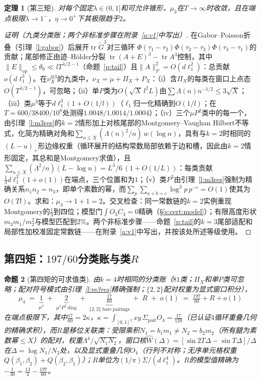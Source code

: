\documentclass[11pt]{article}
\numberwithin{equation}{section}
\newtheorem{theorem}{定理}[section]
\newtheorem{proposition}[theorem]{命题}
\theoremstyle{definition}
\theoremstyle{remark}
\newcommand{\LL}{\Lambda}
\begin{document}
\begin{theorem}[第三矩]\label{t:m3}
对每个固定$\lambda\in(0,1]$和可允许锥形，$\mu_3$在$T\to\infty$时收敛，且在端点极限$\lambda\to1^-$，$\eta\to0^+$下其极限趋于$2$。
\end{theorem}

\begin{proof}[证明（九类分类账；两个非标准步骤在附录~\ref{a:v1}中写出）]
在Gabor--Poisson折叠（引理~\ref{l:gabor}）后展开$\operatorname{tr}\widetilde G^{3}$对三循环
$\Phi(\tau_1-\tau_2)\Phi(\tau_2-\tau_3)\Phi(\tau_3-\tau_1)$的贡献；尾部修正由迹--H\"older分裂
$\operatorname{tr}(A+E)^3-\operatorname{tr}A^3$控制，其中$\|E\|_{\mathrm{op}}\le\theta_0\ll lT^{\lambda/2-1}$（命题~\ref{p:tail}）且$\|A\|_F^2=O(d\ell_1^2)$：总贡献$o(d\ell_1^3)$。在$\nu_X^{\otimes3}$的九类中，$\nu_X=\mu+\Pi_X+P_X$：（i）含$\Pi_X$的每类在窗口上点态$O(T^{\lambda/2-1})$，可忽略；（ii）单$P$类为$O(\sqrt X\,l^{2}L)$由$\sum\LL(n)n^{-1/2}\le3\sqrt X$；（iii）类$\mu^3$等于$d\ell_1^3(1+O(1/l))$（$\ell_1$归一化精确到$O(1/l)$；在$T=600/38400/10^{8}$处测得$1.0048/1.0014/1.0004$）；（iv）三个$\mu P^2$类中的每一个，由引理~\ref{l:m3res}的$k=2$情形加上对核尾部的Montgomery--Vaughan Hilbert不等式，化简为精确对角和$\sum_{n\le X}(\LL(n)^2/n)\,w(\log n)$，具有与$k=2$时相同的$(L-u)_+$形边缘权重（循环展开的结构常数局部依赖于边和槽，因此由$k=2$情形固定，其总和是Montgomery求值），且$\sum_{n\le X}(\LL^2/n)(L-\log n)=L^3/6\,(1+O(1/L))$：每类贡献$\tfrac13d\ell_1^3(1+o(1))$在端点，三个位置和为$1$；（v）类$P^3$由引理~\ref{l:m3res}强制为精确关系$n_1n_2=n_3$，即单个素数的幂，而$\sum_p\sum_{a+b=c}\log^3p\,p^{-c}=O(1)$使其为$O(Tl)$。求和：$\mu_3\to1+1=2$。交叉检查：同一常数链的$k=2$实例重现Montgomery的$\tfrac13$到四位；模型门$\int O_3C_3=0$精确（\S\ref{s:cert:model}）；有限高度形状$m_3m_1/m_2^2$与模型匹配到$2\%$。两个非标准步骤——命题~\ref{p:tail}的$k=3$尾部适配和局部性加校准固定常数链——在附录~\ref{a:v1}中写出，并按该处所述等级使用。
\end{proof}

\subsection{第四矩：$197/60$分类账与类$R$}\label{s:cert:R}

\begin{proposition}[第四矩的可求值类]\label{p:m4classical}
由$k=4$时相同的分类账（$81$类；$\Pi_X$和单$P$类可忽略；配对符号模式由引理~\ref{l:m3res}精确强制；$\{2,2\}$配对权重为显式窗口积分），
\[
\mu_4\;=\;\underbrace{1}_{\mu^4}
\;+\;\underbrace{2}_{\mu^2P^2\ \mathrm{diag}}
\;+\;\underbrace{\tfrac{17}{60}}_{\{2,2\}\ \mathrm{bare\ pairings}}\;+\;R\;+\;o(1)\;=\;\tfrac{197}{60}+R+o(1)
\]
在端点极限下，其中$\tfrac{17}{60}=2\kappa$，$\kappa=\int_{[0,1]^2}xy\,\Sigma_{\mathrm{pair}}O_4
=\tfrac{17}{120}$（已认证$4$循环重叠几何的精确求积），而$R$是移位关联类：受限乘积$N_1=b_1m_1\ne N_2=b_2m_2$（所有腿为素数幂$\le X$）的配对，权重$\LL^4/\sqrt{N_1N_2}$，窗口核$\widehat W(\Delta)=[\sin2T\Delta-\sin T\Delta]/\Delta$在$\Delta=\log N_1/N_2$处，以及显式重叠几何$O_4$（行列不对称；无序单元格权重$Q(\beta_1,\beta_2)+Q(\beta_2,\beta_1)$）；$R$单位为$(1/\pi)\Sigma/(d\ell_1^4)$。$R$的模型值精确为$-\tfrac1{30}=\tfrac{13}4-\tfrac{197}{60}$。
\end{proposition}
\end{document}

